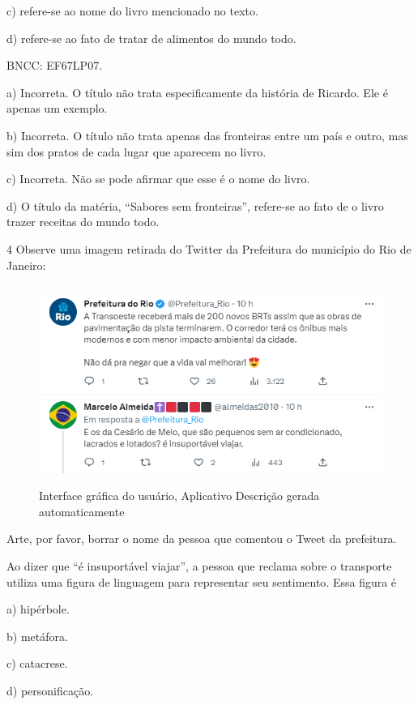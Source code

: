 c) refere-se ao nome do livro mencionado no texto.

d) refere-se ao fato de tratar de alimentos do mundo todo.

BNCC: EF67LP07.

a) Incorreta. O título não trata especificamente da história de Ricardo.
Ele é apenas um exemplo.

b) Incorreta. O título não trata apenas das fronteiras entre um país e
outro, mas sim dos pratos de cada lugar que aparecem no livro.

c) Incorreta. Não se pode afirmar que esse é o nome do livro.

d) O título da matéria, ``Sabores sem fronteiras'', refere-se ao fato de
o livro trazer receitas do mundo todo.

\num{4} Observe uma imagem retirada do Twitter da Prefeitura do
município do Rio de Janeiro:

\begin{figure}
\centering
\includegraphics[width=4.97543in,height=2.56689in]{./imgSAEB_6_POR/media/image6.png}
\caption{Interface gráfica do usuário, Aplicativo Descrição gerada
automaticamente}
\end{figure}


Arte, por favor, borrar o nome da pessoa que comentou o Tweet da
prefeitura.

Ao dizer que ``é insuportável viajar'', a pessoa que reclama sobre o
transporte utiliza uma figura de linguagem para representar seu
sentimento. Essa figura é

a) hipérbole.

b) metáfora.

c) catacrese.

d) personificação.

